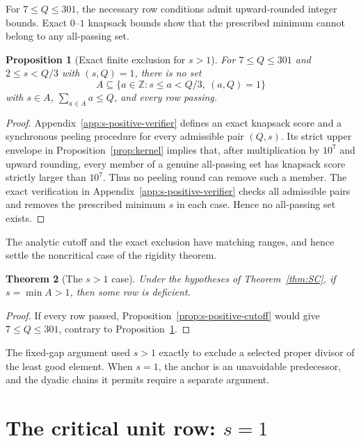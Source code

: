 \documentclass[11pt]{article}
\newtheorem{theorem}{Theorem}[section]
\newtheorem{proposition}[theorem]{Proposition}
\theoremstyle{definition}
\theoremstyle{remark}
\newcommand{\Z}{\mathbb Z}
\begin{document}
For \(7\le Q\le301\), the necessary row conditions admit upward-rounded
integer bounds.  Exact \(0\)--\(1\) knapsack bounds show that the prescribed
minimum cannot belong to any all-passing set.

\begin{proposition}[Exact finite exclusion for \(s>1\)]
\label{prop:s-positive-finite}
For \(7\le Q\le301\) and \(2\le s<Q/3\) with \((s,Q)=1\), there is no
set
\[
 A\subseteq\{a\in\Z:s\le a<Q/3,\ (a,Q)=1\}
\]
with \(s\in A\), \(\sum_{a\in A}a\le Q\), and every row passing.
\end{proposition}

\begin{proof}
Appendix~\ref{app:s-positive-verifier} defines an exact knapsack score and
a synchronous peeling procedure for every admissible pair \((Q,s)\).  Its
strict upper envelope in Proposition~\ref{prop:kernel} implies that, after
multiplication by \(10^7\) and upward rounding, every member of a genuine
all-passing set has knapsack score strictly larger than \(10^7\).  Thus no
peeling round can remove such a member.  The exact verification in
Appendix~\ref{app:s-positive-verifier} checks all admissible pairs and removes
the prescribed minimum \(s\) in each case.  Hence no all-passing set exists.
\end{proof}

The analytic cutoff and the exact exclusion have matching ranges, and hence
settle the noncritical case of the rigidity theorem.

\begin{theorem}[The \(s>1\) case]\label{thm:s-positive}
Under the hypotheses of Theorem~\ref{thm:SC}, if \(s=\min A>1\), then
some row is deficient.
\end{theorem}

\begin{proof}
If every row passed, Proposition~\ref{prop:s-positive-cutoff} would give
\(7\le Q\le301\), contrary to Proposition~\ref{prop:s-positive-finite}.
\end{proof}

The fixed-gap argument used \(s>1\) exactly to exclude a selected proper
divisor of the least good element.  When \(s=1\), the anchor is an unavoidable
predecessor, and the dyadic chains it permits require a separate argument.

\section{The critical unit row: \texorpdfstring{\(s=1\)}{s = 1}}\label{sec:s-one}
\end{document}
